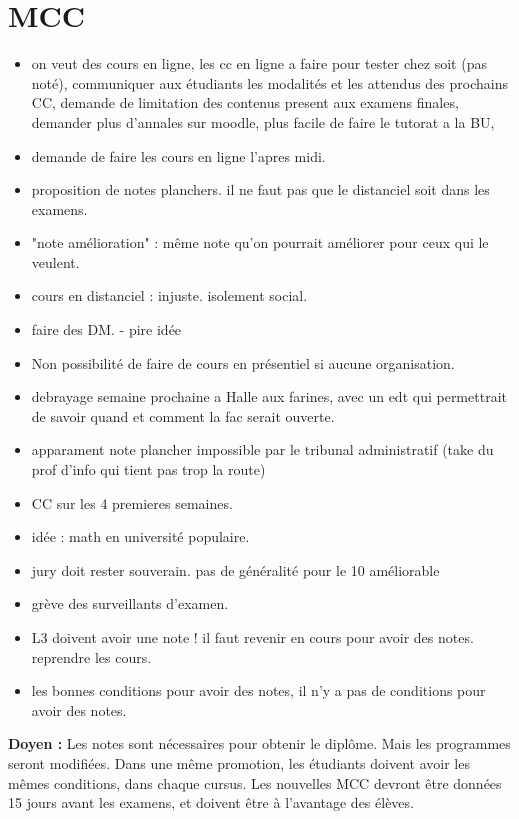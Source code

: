 \documentclass{article}
\begin{document}
\section{MCC}    
\begin{itemize}
    \item on veut des cours en ligne, les cc en ligne a faire pour tester chez soit (pas noté), communiquer aux étudiants les modalités et les attendus des prochains CC, demande de limitation des contenus present aux examens finales, demander plus d'annales sur moodle, plus facile de faire le tutorat a la BU, 
    \item demande de faire les cours en ligne l'apres midi.
    \item proposition de notes planchers. il ne faut pas que le distanciel soit dans les examens.
    \item "note amélioration" : même note qu'on pourrait améliorer pour ceux qui le veulent.
    \item cours en distanciel : injuste. isolement social.
    \item faire des DM. - pire idée 
    \item Non possibilité de faire de cours en présentiel si aucune organisation.
    \item debrayage semaine prochaine a Halle aux farines, avec un edt qui permettrait de savoir quand et comment la fac serait ouverte.
    \item apparament note plancher impossible par le tribunal administratif (take du prof d'info qui tient pas trop la route)
    \item CC sur les 4 premieres semaines.
    \item idée : math en université populaire.
    \item jury doit rester souverain. pas de généralité pour le 10 améliorable
    \item grève des surveillants d'examen.
    \item L3 doivent avoir une note ! il faut revenir en cours pour avoir des notes. reprendre les cours. 
    \item les bonnes conditions pour avoir des notes, il n'y a pas de conditions pour avoir des notes.
\end{itemize}

\textbf{Doyen :} Les notes sont nécessaires pour obtenir le diplôme. Mais les programmes seront modifiées. Dans une même promotion, les étudiants doivent avoir les mêmes conditions, dans chaque cursus. Les nouvelles MCC devront être données 15 jours avant les examens, et doivent être à l'avantage des élèves.
\end{document}
